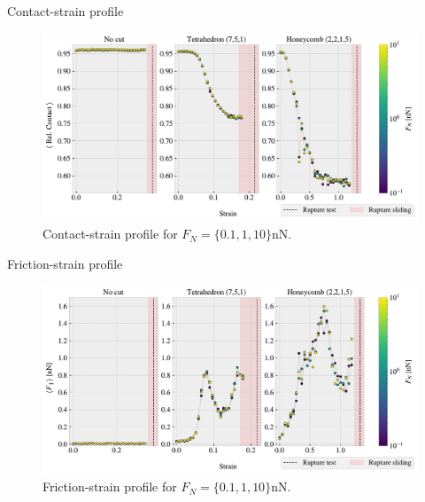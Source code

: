\documentclass[
	10pt, %
]{beamer}
\begin{document}
\begin{frame}{Contact-strain profile}

	\begin{figure}[H]
		\centering
		\includegraphics[width=1\linewidth]{../thesis/figures/baseline/multi_stretch_area_compare.pdf}
		\caption{Contact-strain profile for $F_N = \{0.1, 1, 10\} \text{nN}$.}
	\end{figure}
\end{frame}
%
%
\begin{frame}{Friction-strain profile}
	\begin{figure}[H]
		\centering
		\includegraphics[width=1\linewidth]{../thesis/figures/baseline/multi_stretch_mean_compare.pdf}
		\caption{Friction-strain profile for $F_N = \{0.1, 1, 10\} \text{nN}$.}
	\end{figure}
\end{frame}
%
%
\end{document}
